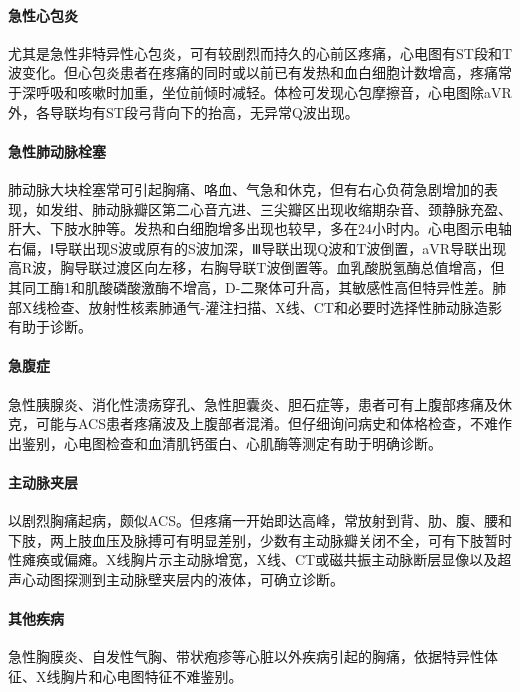 \paragraph{急性心包炎}

尤其是急性非特异性心包炎，可有较剧烈而持久的心前区疼痛，心电图有ST段和T波变化。但心包炎患者在疼痛的同时或以前已有发热和血白细胞计数增高，疼痛常于深呼吸和咳嗽时加重，坐位前倾时减轻。体检可发现心包摩擦音，心电图除aVR外，各导联均有ST段弓背向下的抬高，无异常Q波出现。

\paragraph{急性肺动脉栓塞}

肺动脉大块栓塞常可引起胸痛、咯血、气急和休克，但有右心负荷急剧增加的表现，如发绀、肺动脉瓣区第二心音亢进、三尖瓣区出现收缩期杂音、颈静脉充盈、肝大、下肢水肿等。发热和白细胞增多出现也较早，多在24小时内。心电图示电轴右偏，Ⅰ导联出现S波或原有的S波加深，Ⅲ导联出现Q波和T波倒置，aVR导联出现高R波，胸导联过渡区向左移，右胸导联T波倒置等。血乳酸脱氢酶总值增高，但其同工酶1和肌酸磷酸激酶不增高，D-二聚体可升高，其敏感性高但特异性差。肺部X线检查、放射性核素肺通气-灌注扫描、X线、CT和必要时选择性肺动脉造影有助于诊断。

\paragraph{急腹症}

急性胰腺炎、消化性溃疡穿孔、急性胆囊炎、胆石症等，患者可有上腹部疼痛及休克，可能与ACS患者疼痛波及上腹部者混淆。但仔细询问病史和体格检查，不难作出鉴别，心电图检查和血清肌钙蛋白、心肌酶等测定有助于明确诊断。

\paragraph{主动脉夹层}

以剧烈胸痛起病，颇似ACS。但疼痛一开始即达高峰，常放射到背、肋、腹、腰和下肢，两上肢血压及脉搏可有明显差别，少数有主动脉瓣关闭不全，可有下肢暂时性瘫痪或偏瘫。X线胸片示主动脉增宽，X线、CT或磁共振主动脉断层显像以及超声心动图探测到主动脉壁夹层内的液体，可确立诊断。

\paragraph{其他疾病}

急性胸膜炎、自发性气胸、带状疱疹等心脏以外疾病引起的胸痛，依据特异性体征、X线胸片和心电图特征不难鉴别。

